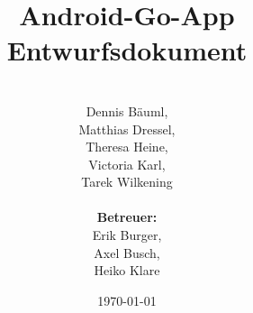 \documentclass[parskip=full]{scrartcl}
\begin{document}
\title{Android-Go-App Entwurfsdokument}
\author{\\Dennis Bäuml,\\ Matthias Dressel,\\ Theresa Heine,\\ Victoria Karl, \\ Tarek Wilkening\\
	\\ \textbf{Betreuer:} \\Erik Burger, \\Axel Busch, \\Heiko Klare \\}
	
\date{\today}
\maketitle
\newpage
\tableofcontents
\newpage


\newpage

\newpage

\newpage





\end{document}

